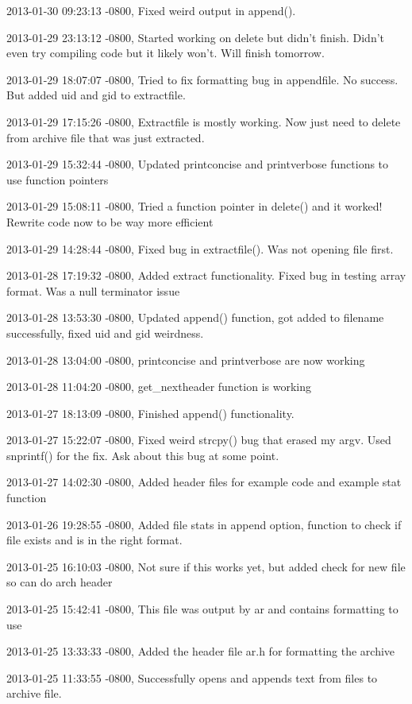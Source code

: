 \documentclass[letterpaper,10pt,titlepage]{article}
\begin{document}
\begin{enumerate}
2013-01-30 09:23:13 -0800, Fixed weird output in append().

2013-01-29 23:13:12 -0800, Started working on delete but didn't finish. Didn't even try compiling code but it likely won't. Will finish tomorrow.

2013-01-29 18:07:07 -0800, Tried to fix formatting bug in appendfile. No success. But added uid and gid to extractfile.

2013-01-29 17:15:26 -0800, Extractfile is mostly working. Now just need to delete from archive file that was just extracted.

2013-01-29 15:32:44 -0800, Updated printconcise and printverbose functions to use function pointers

2013-01-29 15:08:11 -0800, Tried a function pointer in delete() and it worked! Rewrite code now to be way more efficient

2013-01-29 14:28:44 -0800, Fixed bug in extractfile(). Was not opening file first.

2013-01-28 17:19:32 -0800, Added extract functionality. Fixed bug in testing array format. Was a null terminator issue

2013-01-28 13:53:30 -0800, Updated append() function, got \/ added to filename successfully, fixed uid and gid weirdness.

2013-01-28 13:04:00 -0800, printconcise and printverbose are now working

2013-01-28 11:04:20 -0800, get\_nextheader function is working

2013-01-27 18:13:09 -0800, Finished append() functionality.

2013-01-27 15:22:07 -0800, Fixed weird strcpy() bug that erased my argv. Used snprintf() for the fix. Ask about this bug at some point.

2013-01-27 14:02:30 -0800, Added header files for example code and example stat function

2013-01-26 19:28:55 -0800, Added file stats in append option, function to check if file exists and is in the right format.

2013-01-25 16:10:03 -0800, Not sure if this works yet, but added check for new file so can do arch header

2013-01-25 15:42:41 -0800, This file was output by ar and contains formatting to use

2013-01-25 13:33:33 -0800, Added the header file ar.h for formatting the archive

2013-01-25 11:33:55 -0800, Successfully opens and appends text from files to archive file.


\end{enumerate}
\end{document}
